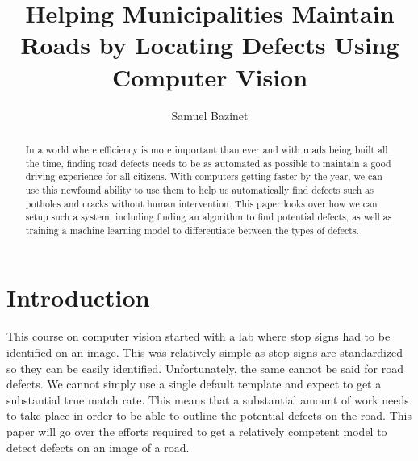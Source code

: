 \documentclass[12pt, letterpaper, twoside]{article}
\title{\textbf{Helping Municipalities Maintain Roads by Locating Defects Using Computer Vision}} %
\author{Samuel Bazinet} %
\affiliation{Ontario Tech University} %
\begin{document}
\maketitle

\begin{abstract}
    \noindent
    
    In a world where efficiency is more important than ever and with roads being built all the time,
    finding road defects needs to be as automated as possible to maintain a good driving experience for all citizens. 
    With computers getting faster by the year, 
    we can use this newfound ability to use them to help us automatically find defects such as potholes and cracks without human intervention.
    This paper looks over how we can setup such a system, 
    including finding an algorithm to find potential defects, 
    as well as training a machine learning model to differentiate between the types of defects.

\end{abstract}

\vspace{2.5cm}


\thispagestyle{firstpage}

\pagebreak


\newgeometry{} %

\section{Introduction}
\label{sec:intro}

This course on computer vision started with a lab where stop signs had to be identified on an image. 
This was relatively simple as stop signs are standardized so they can be easily identified. 
Unfortunately, the same cannot be said for road defects. 
We cannot simply use a single default template and expect to get a substantial true match rate. 
This means that a substantial amount of work needs to take place in order to be able to outline the potential defects on the road.
This paper will go over the efforts required to get a relatively competent model to detect defects on an image of a road. 
\end{document}
